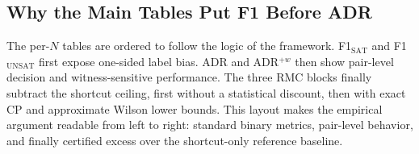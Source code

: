 \documentclass[conference]{IEEEtran}
\theoremstyle{remark}
\begin{document}
\subsection{Why the Main Tables Put F1 Before ADR}

The per-$N$ tables are ordered to follow the logic of the framework.
F1$_{\mathrm{SAT}}$ and F1$_{\mathrm{UNSAT}}$ first expose one-sided label bias.
ADR and ADR$^{+w}$ then show pair-level decision and witness-sensitive
performance.
The three RMC blocks finally subtract the shortcut ceiling, first without a
statistical discount, then with exact CP and approximate Wilson lower bounds.
This layout makes the empirical argument readable from left to right:
standard binary metrics, pair-level behavior, and finally certified excess over
the shortcut-only reference baseline.




\end{document}
